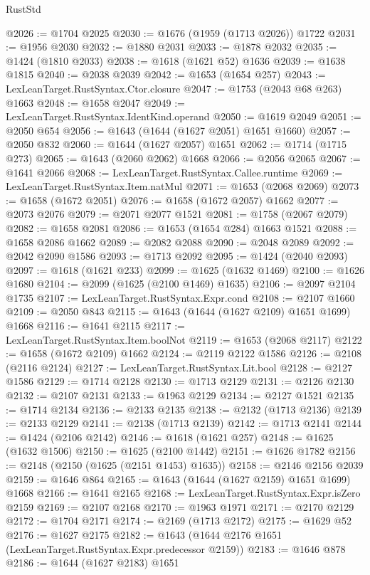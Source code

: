 \begin{lexlean}{RustStd}
\begin{coremodule}
@2026 := @1704 @2025
@2030 := @1676 (@1959 (@1713 @2026)) @1722
@2031 := @1956 @2030
@2032 := @1880 @2031
@2033 := @1878 @2032
@2035 := @1424 (@1810 @2033)
@2038 := @1618 (@1621 @52) @1636
@2039 := @1638 @1815
@2040 := @2038 @2039
@2042 := @1653 (@1654 @257)
@2043 := LexLeanTarget.RustSyntax.Ctor.closure
@2047 := @1753 (@2043 @68 @263) @1663
@2048 := @1658 @2047
@2049 := LexLeanTarget.RustSyntax.IdentKind.operand
@2050 := @1619 @2049
@2051 := @2050 @654
@2056 := @1643 (@1644 (@1627 @2051) @1651 @1660)
@2057 := @2050 @832
@2060 := @1644 (@1627 @2057) @1651
@2062 := @1714 (@1715 @273)
@2065 := @1643 (@2060 @2062) @1668
@2066 := @2056 @2065
@2067 := @1641 @2066
@2068 := LexLeanTarget.RustSyntax.Callee.runtime
@2069 := LexLeanTarget.RustSyntax.Item.natMul
@2071 := @1653 (@2068 @2069)
@2073 := @1658 (@1672 @2051)
@2076 := @1658 (@1672 @2057) @1662
@2077 := @2073 @2076
@2079 := @2071 @2077 @1521
@2081 := @1758 (@2067 @2079)
@2082 := @1658 @2081
@2086 := @1653 (@1654 @284) @1663 @1521
@2088 := @1658 @2086 @1662
@2089 := @2082 @2088
@2090 := @2048 @2089
@2092 := @2042 @2090 @1586
@2093 := @1713 @2092
@2095 := @1424 (@2040 @2093)
@2097 := @1618 (@1621 @233)
@2099 := @1625 (@1632 @1469)
@2100 := @1626 @1680
@2104 := @2099 (@1625 (@2100 @1469) @1635)
@2106 := @2097 @2104 @1735
@2107 := LexLeanTarget.RustSyntax.Expr.cond
@2108 := @2107 @1660
@2109 := @2050 @843
@2115 := @1643 (@1644 (@1627 @2109) @1651 @1699) @1668
@2116 := @1641 @2115
@2117 := LexLeanTarget.RustSyntax.Item.boolNot
@2119 := @1653 (@2068 @2117)
@2122 := @1658 (@1672 @2109) @1662
@2124 := @2119 @2122 @1586
@2126 := @2108 (@2116 @2124)
@2127 := LexLeanTarget.RustSyntax.Lit.bool
@2128 := @2127 @1586
@2129 := @1714 @2128
@2130 := @1713 @2129
@2131 := @2126 @2130
@2132 := @2107 @2131
@2133 := @1963 @2129
@2134 := @2127 @1521
@2135 := @1714 @2134
@2136 := @2133 @2135
@2138 := @2132 (@1713 @2136)
@2139 := @2133 @2129
@2141 := @2138 (@1713 @2139)
@2142 := @1713 @2141
@2144 := @1424 (@2106 @2142)
@2146 := @1618 (@1621 @257)
@2148 := @1625 (@1632 @1506)
@2150 := @1625 (@2100 @1442)
@2151 := @1626 @1782
@2156 := @2148 (@2150 (@1625 (@2151 @1453) @1635))
@2158 := @2146 @2156 @2039
@2159 := @1646 @864
@2165 := @1643 (@1644 (@1627 @2159) @1651 @1699) @1668
@2166 := @1641 @2165
@2168 := LexLeanTarget.RustSyntax.Expr.isZero @2159
@2169 := @2107 @2168
@2170 := @1963 @1971
@2171 := @2170 @2129
@2172 := @1704 @2171
@2174 := @2169 (@1713 @2172)
@2175 := @1629 @52
@2176 := @1627 @2175
@2182 := @1643 (@1644 @2176 @1651 (LexLeanTarget.RustSyntax.Expr.predecessor @2159))
@2183 := @1646 @878
@2186 := @1644 (@1627 @2183) @1651

\end{coremodule}
\end{lexlean}
